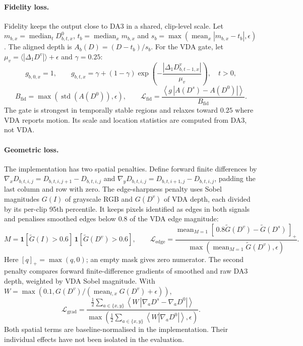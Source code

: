 \paragraph{Fidelity loss.}
\label{sec:smoother-fidelity}

Fidelity keeps the output close to DA3 in a shared, clip-level scale. Let $m_{b,x}=\operatorname{median}_tD^0_{b,t,x}$,
$t_b=\operatorname{median}_x m_{b,x}$ and
$s_b=\max(\operatorname{mean}_x|m_{b,x}-t_b|,\epsilon)$. The aligned depth is
$A_b(D)=(D-t_b)/s_b$. For the VDA gate, let
$\mu_v=\langle|\Delta_1D^v|\rangle+\epsilon$ and $\gamma=0.25$:
\[
    g_{b,0,x}=1,\qquad
    g_{b,t,x}=\gamma+(1-\gamma)
       \exp\!\left(-\frac{|\Delta_1D^v_{b,t-1,x}|}{\mu_v}\right),\quad t>0,
\]
\[
    B_{\mathrm{fid}}=\max\!\left(\operatorname{std}(A(D^0)),\epsilon\right),
    \qquad
    \mathcal{L}_{\mathrm{fid}}
      =\frac{\left\langle g\,|A(D^s)-A(D^0)|\right\rangle}{B_{\mathrm{fid}}}.
\]
The gate is strongest in temporally stable regions and relaxes toward $0.25$ where VDA reports
motion. Its scale and location statistics are computed from DA3, not VDA.


\paragraph{Geometric loss.}
\label{sec:smoother-geometric}

The implementation has two spatial penalties. Define forward finite differences by
$\nabla_xD_{b,t,i,j}=D_{b,t,i,j+1}-D_{b,t,i,j}$ and
$\nabla_yD_{b,t,i,j}=D_{b,t,i+1,j}-D_{b,t,i,j}$, padding the last column and row with zero.
The edge-sharpness penalty uses Sobel magnitudes $G(I)$ of grayscale RGB and $G(D^v)$ of VDA
depth, each divided by its per-clip 95th percentile. It keeps pixels identified as edges in both
signals and penalises smoothed edges below $0.8$ of the VDA edge magnitude:
\[
    M=\mathbf{1}[\widetilde G(I)>0.6]\,\mathbf{1}[\widetilde G(D^v)>0.6],\qquad
    \mathcal{L}_{\mathrm{edge}}
      =\frac{\operatorname{mean}_{M=1}
             [\,0.8\widetilde G(D^v)-\widetilde G(D^s)\,]_+}
             {\max\!\left(\operatorname{mean}_{M=1}\widetilde G(D^v),\epsilon\right)}.
\]
Here $[q]_+=\max(q,0)$; an empty mask gives zero numerator. The second penalty compares forward
finite-difference gradients of smoothed and raw DA3 depth, weighted by VDA Sobel magnitude. With
$W=\max(0.1,G(D^v)/(\operatorname{mean}_{t,x}G(D^v)+\epsilon))$,
\[
    \mathcal{L}_{\mathrm{grad}}
      =\frac{\frac12\sum_{a\in\{x,y\}}\left\langle W\,
             |\nabla_aD^s-\nabla_aD^0|\right\rangle}
             {\max\!\left(\frac12\sum_{a\in\{x,y\}}\left\langle W|\nabla_aD^0|\right\rangle,
             \epsilon\right)}.
\]
Both spatial terms are baseline-normalised in the implementation. Their individual effects have
not been isolated in the evaluation.


